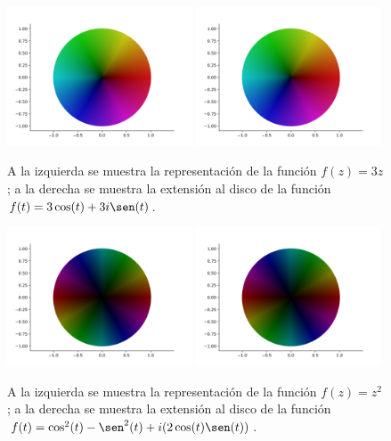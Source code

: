 \begin{figure}[h]
    \centering
    \includegraphics[width=0.49\textwidth]{../Aplicacion/3z.png}
    \hfill
    \includegraphics[width=0.49\textwidth]{../Aplicacion/3cos(t)+3isen(t).png}
    \caption{A la izquierda se muestra la representación de la función $f(z) = 3z$; a la derecha se muestra la extensión al disco de la función $f(t) = 3\cos(t) + 3i \sen(t)$.}
    \label{fig:comparacion2}
\end{figure}


\begin{figure}[h]
    \centering
    \includegraphics[width=0.49\textwidth]{../Aplicacion/z^2(2).png}
    \hfill
    \includegraphics[width=0.49\textwidth]{../Aplicacion/cos^2(t)-sen^2(t)+(2cos(t)sen(t))i.png}
    \caption{A la izquierda se muestra la representación de la función $f(z) = z^2$; a la derecha se muestra la extensión al disco de la función $f(t) = \cos^2(t) - \sen^2(t) + i (2 \cos(t) \sen(t))$.}
    \label{fig:comparacion3}
\end{figure}


